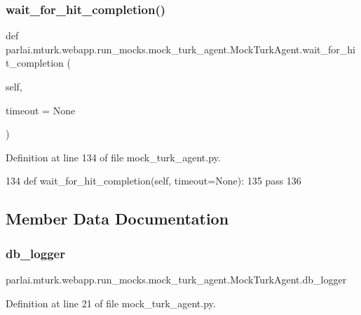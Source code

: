 \subsubsection{\texorpdfstring{wait\+\_\+for\+\_\+hit\+\_\+completion()}{wait\_for\_hit\_completion()}}
{\footnotesize\ttfamily def parlai.\+mturk.\+webapp.\+run\+\_\+mocks.\+mock\+\_\+turk\+\_\+agent.\+Mock\+Turk\+Agent.\+wait\+\_\+for\+\_\+hit\+\_\+completion (\begin{DoxyParamCaption}\item[{}]{self,  }\item[{}]{timeout = {\ttfamily None} }\end{DoxyParamCaption})}



Definition at line 134 of file mock\+\_\+turk\+\_\+agent.\+py.


\begin{DoxyCode}
134     \textcolor{keyword}{def }wait\_for\_hit\_completion(self, timeout=None):
135         \textcolor{keywordflow}{pass}
136 
\end{DoxyCode}


\subsection{Member Data Documentation}
\mbox{\label{classparlai_1_1mturk_1_1webapp_1_1run__mocks_1_1mock__turk__agent_1_1MockTurkAgent_af5b22167ce7c695856bd9dac6c0fdd4f}} 
\subsubsection{\texorpdfstring{db\+\_\+logger}{db\_logger}}
{\footnotesize\ttfamily parlai.\+mturk.\+webapp.\+run\+\_\+mocks.\+mock\+\_\+turk\+\_\+agent.\+Mock\+Turk\+Agent.\+db\+\_\+logger}



Definition at line 21 of file mock\+\_\+turk\+\_\+agent.\+py.

